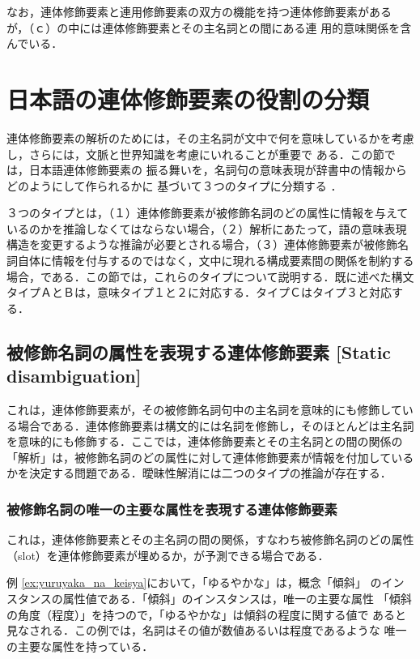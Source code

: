 なお，連体修飾要素と連用修飾要素の双方の機能を持つ連体修飾要素がある
\cite{Kanzaki99} が，（ｃ）の中には連体修飾要素とその主名詞との間にある連
用的意味関係を含んでいる．

\section{日本語の連体修飾要素の役割の分類}
\label{sec:classification2}

連体修飾要素の解析のためには，その主名詞が文中で何を意味しているかを考慮
し\cite{Bouillon96}，さらには，文脈と世界知識を考慮にいれることが重要で
ある\cite{Pustejovsky95,Lascarides98}．この節では，日本語連体修飾要素の
振る舞いを，名詞句の意味表現が辞書中の情報からどのようにして作られるかに
基づいて３つのタイプに分類する\cite{Kanzaki97,Kanzaki98} ．

３つのタイプとは，（１）連体修飾要素が被修飾名詞のどの属性に情報を与えて
いるのかを推論しなくてはならない場合，（２）解析にあたって，語の意味表現
構造を変更するような推論が必要とされる場合，（３）連体修飾要素が被修飾名
詞自体に情報を付与するのではなく，文中に現れる構成要素間の関係を制約する
場合，である．この節では，これらのタイプについて説明する．既に述べた構文
タイプＡとＢは，意味タイプ１と２に対応する．タイプＣはタイプ３と対応する．

\subsection{被修飾名詞の属性を表現する連体修飾要素 [Static disambiguation] }
\label{sec:Static_disambiguation}

これは，連体修飾要素が，その被修飾名詞句中の主名詞を意味的にも修飾してい
る場合である．連体修飾要素は構文的には名詞を修飾し，そのほとんどは主名詞
を意味的にも修飾する．ここでは，連体修飾要素とその主名詞との間の関係の
「解析」は，被修飾名詞のどの属性に対して連体修飾要素が情報を付加している
かを決定する問題である．曖昧性解消には二つのタイプの推論が存在する． 

\subsubsection{被修飾名詞の唯一の主要な属性を表現する連体修飾要素}

これは，連体修飾要素とその主名詞の間の関係，すなわち被修飾名詞のどの属性
（slot）を連体修飾要素が埋めるか，が予測できる場合である．

例 \ref{ex:yuruyaka_na_keisya}において，「ゆるやかな」は，概念「傾斜」
のインスタンスの属性値である．「傾斜」のインスタンスは，唯一の主要な属性
「傾斜の角度（程度）」を持つので，「ゆるやかな」は傾斜の程度に関する値で
あると見なされる．この例では，名詞はその値が数値あるいは程度であるような
唯一の主要な属性を持っている．

